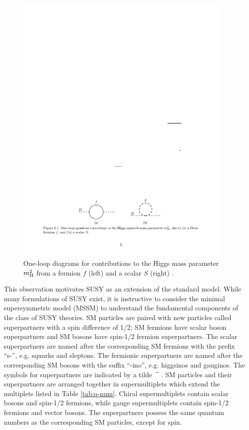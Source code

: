 \begin{figure}[hbt]
\begin{center}
\includegraphics[width=0.95\textwidth]{figures/9709356v6-higgs-cancel.pdf}
\caption{One-loop diagrams for contributions to the Higgs mass parameter $m_{\mathrm{H}}^{2}$ from a fermion $f$ (left) and a scalar $S$ (right) \cite{Primer}.}
\label{fig:higgs-cancel}
\end{center}
\end{figure}

This observation motivates SUSY as an extension of the standard model. While many formulations of SUSY exist, it is instructive to consider the minimal supersymmetric model (MSSM) to understand the fundamental components of the class of SUSY theories. SM particles are paired with new particles called superpartners with a spin difference of 1/2; SM fermions have scalar boson superpartners and SM bosons have spin-1/2 fermion superpartners. The scalar superpartners are named after the corresponding SM fermions with the prefix ``s-'', e.g. squarks and sleptons. The fermionic superpartners are named after the corresponding SM bosons with the suffix ``-ino'', e.g. higgsinos and gauginos. The symbols for superpartners are indicated by a tilde $\widetilde{\hphantom{H}}$. SM particles and their superpartners are arranged together in supermultiplets which extend the multiplets listed in Table \ref{tab:q-num}. Chiral supermultiplets contain scalar bosons and spin-1/2 fermions, while gauge supermultiplets contain spin-1/2 fermions and vector bosons. The superpartners possess the same quantum numbers as the corresponding SM particles, except for spin.

